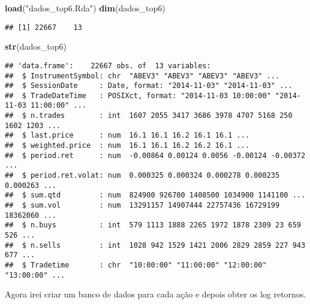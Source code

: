 \documentclass[]{article}
\newenvironment{Shaded}{\begin{snugshade}}{\end{snugshade}}
\newcommand{\KeywordTok}[1]{\textcolor[rgb]{0.13,0.29,0.53}{\textbf{{#1}}}}
\newcommand{\StringTok}[1]{\textcolor[rgb]{0.31,0.60,0.02}{{#1}}}
\newcommand{\NormalTok}[1]{{#1}}
\begin{document}
\begin{Shaded}
\begin{Highlighting}[]
\KeywordTok{load}\NormalTok{(}\StringTok{"dados_top6.Rda"}\NormalTok{)}
\KeywordTok{dim}\NormalTok{(dados_top6)}
\end{Highlighting}
\end{Shaded}

\begin{verbatim}
## [1] 22667    13
\end{verbatim}

\begin{Shaded}
\begin{Highlighting}[]
\KeywordTok{str}\NormalTok{(dados_top6)}
\end{Highlighting}
\end{Shaded}

\begin{verbatim}
## 'data.frame':    22667 obs. of  13 variables:
##  $ InstrumentSymbol: chr  "ABEV3" "ABEV3" "ABEV3" "ABEV3" ...
##  $ SessionDate     : Date, format: "2014-11-03" "2014-11-03" ...
##  $ TradeDateTime   : POSIXct, format: "2014-11-03 10:00:00" "2014-11-03 11:00:00" ...
##  $ n.trades        : int  1607 2055 3417 3686 3978 4707 5168 250 1602 1203 ...
##  $ last.price      : num  16.1 16.1 16.2 16.1 16.1 ...
##  $ weighted.price  : num  16.1 16.1 16.2 16.2 16.1 ...
##  $ period.ret      : num  -0.00864 0.00124 0.0056 -0.00124 -0.00372 ...
##  $ period.ret.volat: num  0.000325 0.000324 0.000278 0.000235 0.000263 ...
##  $ sum.qtd         : num  824900 926700 1408500 1034900 1141100 ...
##  $ sum.vol         : num  13291157 14907444 22757436 16729199 18362060 ...
##  $ n.buys          : int  579 1113 1888 2265 1972 1878 2309 23 659 526 ...
##  $ n.sells         : int  1028 942 1529 1421 2006 2829 2859 227 943 677 ...
##  $ Tradetime       : chr  "10:00:00" "11:00:00" "12:00:00" "13:00:00" ...
\end{verbatim}

Agora irei criar um banco de dados para cada ação e depois obter os log
retornos.
\end{document}
